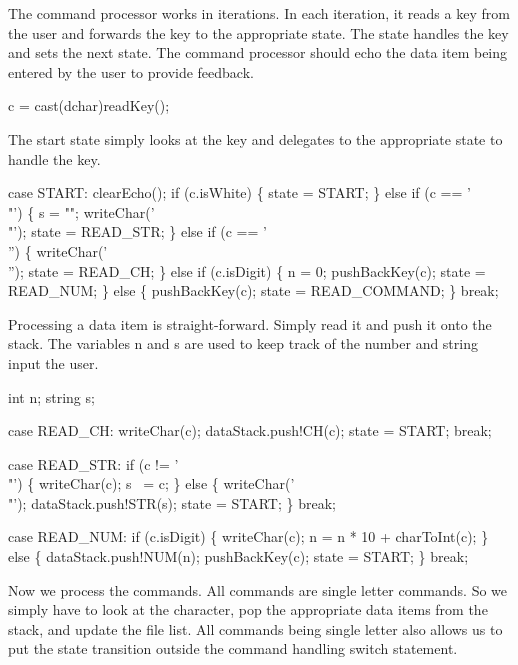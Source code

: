 \nwendcode{}The command processor works in iterations. In each iteration, it
reads a key from the user and forwards the key to the appropriate
state. The state handles the key and sets the next state. The command
processor should echo the data item being entered by the user to
provide feedback.

\nwenddocs{}\endmoddef\nwstartdeflinemarkup\nwenddeflinemarkup
c   = cast(dchar)readKey();

\nwendcode{}The start state simply looks at the key and delegates to the
appropriate state to handle the key.

\nwenddocs{}\endmoddef\nwstartdeflinemarkup\nwenddeflinemarkup
case START:
  clearEcho();
  if (c.isWhite) \{
    state = START;
  \} else if (c == '\\"') \{
    s = "";
    writeChar('\\"');
    state = READ_STR;
  \} else if (c == '\\'') \{
    writeChar('\\'');
    state = READ_CH;
  \} else if (c.isDigit) \{
    n = 0;
    pushBackKey(c);
    state = READ_NUM;
  \} else \{
    pushBackKey(c);
    state = READ_COMMAND;
  \}
  break;

\nwendcode{}Processing a data item is straight-forward. Simply read it and push
it onto the stack. The variables {\Tt{}n\nwendquote} and {\Tt{}s\nwendquote} are used to keep
track of the number and string input the user.

\nwenddocs{}\plusendmoddef\nwstartdeflinemarkup\nwenddeflinemarkup
int n;
string s;

\nwendcode{}\endmoddef\nwstartdeflinemarkup\nwenddeflinemarkup
case READ_CH:
  writeChar(c);
  dataStack.push!CH(c);
  state = START;
  break;

case READ_STR:
  if (c != '\\"') \{
    writeChar(c);
    s ~= c;
  \} else \{
    writeChar('\\"');
    dataStack.push!STR(s);
    state = START;
  \}
  break;

case READ_NUM:
  if (c.isDigit) \{
    writeChar(c);
    n = n * 10 + charToInt(c);
  \} else \{
    dataStack.push!NUM(n);
    pushBackKey(c);
    state = START;
  \}
  break;

\nwendcode{}Now we process the commands. All commands are single letter
commands. So we simply have to look at the character, pop the
appropriate data items from the stack, and update the file list. All
commands being single letter also allows us to put the state
transition outside the command handling {\Tt{}switch\nwendquote} statement.

